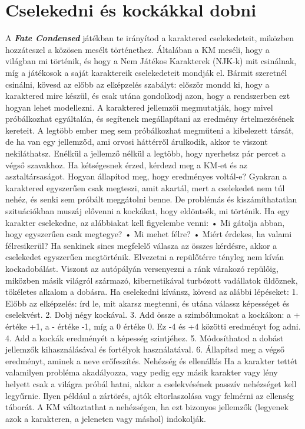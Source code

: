 \documentclass[oneside]{book}
\newcommand{\fate}[1]{\textbf{\textit{#1}}}
\begin{document}
\chapter{Cselekedni és kockákkal dobni}
A \fate{Fate Condensed} játékban te irányítod a karaktered cselekedeteit, miközben hozzáteszel a közösen mesélt történethez. Általában a KM meséli, hogy a világban mi történik, és hogy a Nem Játékos Karakterek (NJK‑k) mit csinálnak, míg a játékosok a saját karaktereik cselekedeteit mondják el.
Bármit szeretnél csinálni, kövesd az előbb az elképzelés szabályt: először mondd ki, hogy a karaktered mire készül, és csak utána gondolkodj azon, hogy a rendszerben ezt hogyan lehet modellezni. A karaktered jellemzői megmutatják, hogy mivel próbálkozhat egyáltalán, és segítenek megállapítani az eredmény értelmezésének kereteit. A legtöbb ember meg sem próbálkozhat megműteni a kibelezett társát, de ha van egy jellemződ, ami orvosi háttérről árulkodik, akkor te viszont nekiláthatsz. Enélkül a jellemző nélkül a legtöbb, hogy nyerhetsz pár percet a végső szavakhoz. Ha kétségesnek érzed, kérdezd meg a KM‑et és az asztaltársaságot.
Hogyan állapítod meg, hogy eredményes voltál‑e? Gyakran a karaktered egyszerűen csak megteszi, amit akartál, mert a cselekedet nem túl nehéz, és senki sem próbált meggátolni benne. De problémás és kiszámíthatatlan szituációkban muszáj elővenni a kockákat, hogy eldöntsék, mi történik.
Ha egy karakter cselekedne, az alábbiakat kell figyelembe venni:
    • Mi gátolja abban, hogy egyszerűen csak megtegye?
    • Mi mehet félre?
    • Miért érdekes, ha valami félresikerül?
Ha senkinek sincs megfelelő válasza az összes kérdésre, akkor a cselekedet egyszerűen megtörténik. Elvezetni a repülőtérre tényleg nem kíván kockadobálást. Viszont az autópályán versenyezni a ránk várakozó repülőig, miközben másik világról származó, kibernetikával turbózott vadállatok üldöznek, tökéletes alkalom a dobásra.
Ha cselekedni kívánsz, kövesd az alábbi lépéseket:
    1. Előbb az elképzelés: írd le, mit akarsz megtenni, és utána válassz képességet és cselekvést.
    2. Dobj négy kockával.
    3. Add össze a szimbólumokat a kockákon: a + értéke +1, a - értéke -1, míg a 0 értéke 0.
Ez -4 és +4 közötti eredményt fog adni.
    4. Add a kockák eredményét a képesség szintjéhez.
    5. Módosíthatod a dobást jellemzők kihasználásával és fortélyok használatával.
    6. Állapítsd meg a végső eredményt, aminek a neve erőfeszítés.
Nehézség és ellenállás
Ha a karakter tettét valamilyen probléma akadályozza, vagy pedig egy másik karakter vagy lény helyett csak a világra próbál hatni, akkor a cselekvésének passzív nehézséget kell legyűrnie. Ilyen például a zártörés, ajtók eltorlaszolása vagy felmérni az ellenség táborát. A KM változtathat a nehézségen, ha ezt bizonyos jellemzők (legyenek azok a karakteren, a jeleneten vagy máshol) indokolják.
\end{document}
